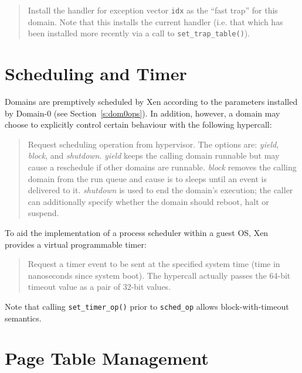 \documentclass[11pt,twoside,final,openright]{xenstyle}
\begin{document}
\begin{quote}

Install the handler for exception vector {\tt idx} as the ``fast
trap'' for this domain. Note that this installs the current handler 
(i.e. that which has been installed more recently via a call 
to {\tt set\_trap\_table()}). 

\end{quote}



\section{Scheduling and Timer}

Domains are premptively scheduled by Xen according to the 
parameters installed by Domain-0 (see Section~\ref{s:dom0ops}). 
In addition, however, a domain may choose to explicitly 
control certain behaviour with the following hypercall: 

\begin{quote} 

Request scheduling operation from hypervisor. The options are: {\it
yield}, {\it block}, and {\it shutdown}.  {\it yield} keeps the
calling domain runnable but may cause a reschedule if other domains
are runnable.  {\it block} removes the calling domain from the run
queue and cause is to sleeps until an event is delivered to it.  {\it
shutdown} is used to end the domain's execution; the caller can
additionally specify whether the domain should reboot, halt or
suspend.
\end{quote} 

To aid the implementation of a process scheduler within a guest OS,
Xen provides a virtual programmable timer:

\begin{quote}

Request a timer event to be sent at the specified system time (time 
in nanoseconds since system boot). The hypercall actually passes the 
64-bit timeout value as a pair of 32-bit values. 

\end{quote} 

Note that calling {\tt set\_timer\_op()} prior to {\tt sched\_op} 
allows block-with-timeout semantics. 


\section{Page Table Management} 
\end{document}
